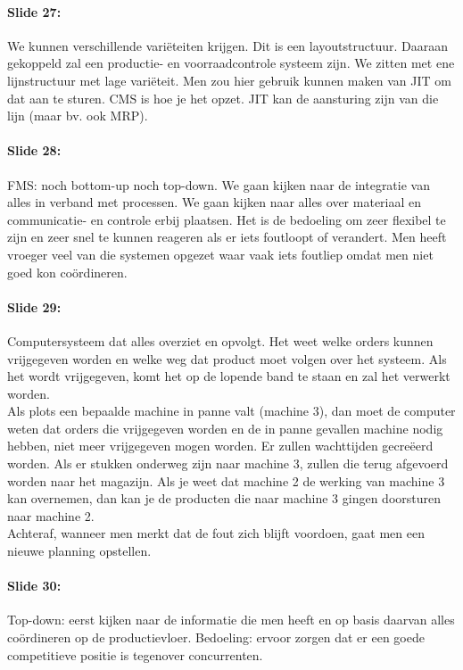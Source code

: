\documentclass[10pt,a4paper]{report}
\begin{document}
\paragraph{Slide 27:} We kunnen verschillende vari\"eteiten krijgen. Dit is een layoutstructuur. Daaraan gekoppeld zal een productie- en voorraadcontrole systeem zijn. We zitten met ene lijnstructuur met lage vari\"eteit. Men zou hier gebruik kunnen maken van JIT om dat aan te sturen. CMS is hoe je het opzet. JIT kan de aansturing zijn van die lijn (maar bv. ook MRP). 

\paragraph{Slide 28:} FMS: noch bottom-up noch top-down. We gaan kijken naar de integratie van alles in verband met processen. We gaan kijken naar alles over materiaal en communicatie- en controle erbij plaatsen. Het is de bedoeling om zeer flexibel te zijn en zeer snel te kunnen reageren als er iets foutloopt of verandert. Men heeft vroeger veel van die systemen opgezet waar vaak iets foutliep omdat men niet goed kon co\"ordineren.

\paragraph{Slide 29:} Computersysteem dat alles overziet en opvolgt. Het weet welke orders kunnen vrijgegeven worden en welke weg dat product moet volgen over het systeem. Als het wordt vrijgegeven, komt het op de lopende band te staan en zal het verwerkt worden.\\
Als plots een bepaalde machine in panne valt (machine 3), dan moet de computer weten dat orders die vrijgegeven worden en de in panne gevallen machine nodig hebben, niet meer vrijgegeven mogen worden. Er zullen wachttijden gecre\"eerd worden. Als er stukken onderweg zijn naar machine 3, zullen die terug afgevoerd worden naar het magazijn. Als je weet dat machine 2 de werking van machine 3 kan overnemen, dan kan je de producten die naar machine 3 gingen doorsturen naar machine 2.\\
Achteraf, wanneer men merkt dat de fout zich blijft voordoen, gaat men een nieuwe planning opstellen.

\paragraph{Slide 30:} Top-down: eerst kijken naar de informatie die men heeft en op basis daarvan alles co\"ordineren op de productievloer. Bedoeling: ervoor zorgen dat er een goede competitieve positie is tegenover concurrenten.
\end{document}

